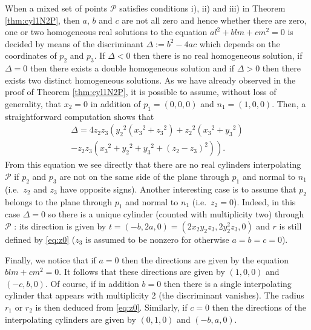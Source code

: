 \documentclass[5p]{elsarticle}
\newcommand\Pc{\mathcal P}
\newcommand{\com}[1]{{\color{black} #1}}
\begin{document}
When a mixed set of points $\Pc$ satisfies conditions i), ii) and iii) in \com{Theorem \ref{thm:cyl1N2P}}, then $a$, $b$ and $c$ are not all zero and hence \com{whether there are} zero, one or two homogeneous real solutions to the equation $al^2+blm+cm^2=0$ is decided by means of the discriminant  $\Delta:=b^2-4ac$ which depends on the coordinates of $p_2$ and $p_3$. If $\Delta<0$ then there is no real homogeneous solution, if $\Delta=0$ then \com{there exists} a double homogeneous solution and if $\Delta>0$ then there exists two distinct homogeneous solutions. As we have already observed in the proof of Theorem \ref{thm:cyl1N2P}, it is possible to assume, without loss of generality, that $x_2=0$ in addition of $p_1=(0,0,0)$ and $n_1=(1,0,0)$. Then, a straightforward computation shows that 
\begin{multline*}
\Delta=
4 {  z_2} {  z_3}  \left( {{  y_2}}^{2} \left( {{  x_3}}^{2}+{{
  z_3}}^{2} \right) +{{  z_2}}^{2} \left( {{  x_3}}^{2}+{{  y_3}}^
{2} \right)\right. \\ \left. -{  z_2} {  z_3}  \left( {{  x_3}}^{2}+{{  y_2}}^{2}
+{{  y_3}}^{2}+ \left( {  z_2}-{  z_3} \right) ^{2} \right) 
 \right).	
\end{multline*}
\com{From} this equation we see directly that there \com{are} no real cylinders interpolating $\Pc$ if $p_2$ and $p_3$ \com{are not} on the same side of the plane through $p_1$ and normal to $n_1$ (i.e.~$z_2$ and $z_3$ have opposite signs). Another interesting case is to assume that $p_2$ belongs to the plane through $p_1$ and normal to $n_1$ (i.e.~$z_2=0$). Indeed, in this case $\Delta=0$ so there is a unique cylinder (counted with multiplicity two) through $\Pc$ : its direction is given by  $t=(-b,2a,0)=(2x_2y_2z_3,2y_2^2z_3,0)$ and $r$ is still defined by \eqref{eq:z0} ($z_3$ is assumed to be nonzero for otherwise $a=b=c=0$).

Finally, we notice that if $a=0$ then the directions are given by the equation $blm+cm^2=0.$
It follows that these directions are given by $(1,0,0)$ and $(-c,b,0)$. Of course, if in addition $b=0$ then there is a single \com{interpolating} cylinder that appears with multiplicity 2 (the discriminant vanishes). The radius \com{$r_1$ or $r_2$ is} then deduced from \eqref{eq:z0}. Similarly, if $c=0$ then the directions of the interpolating cylinders are given by $(0,1,0)$ and $(-b,a,0)$.
\end{document}
